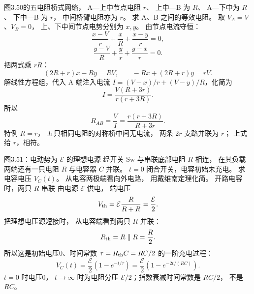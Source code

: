 图3.50的五电阻桥式网络，
A—上中节点电阻 $r$、
上中—B 为 $R$、
A—下中为 $R$、
下中—B 为 $r$，
中间桥臂电阻亦为 $r$。
求 A、B 之间的等效电阻。
\exsolution
取 $V_A=V$、$V_B=0$，
上、下中间节点电势分别为 $x,y$。
由节点电流守恒：
\[
\frac{x-V}r+\frac xR+\frac{x-y}r=0,
\]
\[
\frac{y-V}R+\frac yr+\frac{y-x}r=0.
\]
把两式乘 $rR$：
\[
(2R+r)x-Ry=RV,\qquad
-Rx+(2R+r)y=rV.
\]
解线性方程组，代入 A 端注入电流
$I=(V-x)/r+(V-y)/R$，化简为
\[
I=\frac{V(R+3r)}{r(r+3R)}.
\]
所以
\[
\boxed{R_{AB}=\frac VI
=\frac{r(r+3R)}{R+3r}}.
\]
\excheck 特例 $R=r$，
五只相同电阻的对称桥中间无电流，
两条 $2r$ 支路并联为 $r$；
上式给 $r$，相符。

图3.51：电动势为 $\mathcal E$ 的理想电源
经开关 Sw 与串联底部电阻 $R$ 相连，
在其负载两端还有一只电阻 $R$
与电容器 $C$ 并联。
$t=0$ 闭合开关，电容初始未充电。
求电容电压 $V_C(t)$。
\exsolution
从电容两极端看向外电路，
用戴维南定理化简。
开路电容时，两只 $R$ 串联
由电源 $\mathcal E$ 供电，
端电压
\[
V_{\rm th}=\mathcal E\frac R{R+R}
=\frac{\mathcal E}{2}.
\]
把理想电压源短接时，
从电容端看到两只 $R$ 并联：
\[
R_{\rm th}=R\parallel R=\frac R2.
\]
所以这是初始电压0、时间常数
$\tau=R_{\rm th}C=RC/2$ 的一阶充电过程：
\[
\boxed{V_C(t)=
\frac{\mathcal E}{2}
\left(1-e^{-t/\tau}\right)
=\frac{\mathcal E}{2}
\left(1-e^{-2t/(RC)}\right)}.
\]
\excheck $t=0$ 时电压0，
$t\to\infty$ 时为电阻分压
$\mathcal E/2$；指数衰减时间常数是 $RC/2$，
不是 $RC$。
